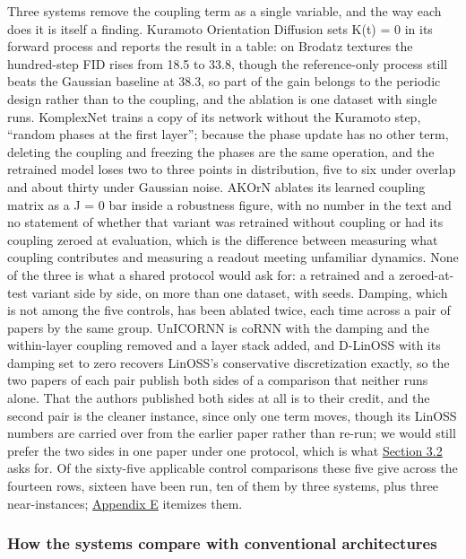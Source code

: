 \documentclass[10pt]{article}
\begin{document}
Three systems remove the coupling term as a single variable, and the way
each does it is itself a finding. Kuramoto Orientation Diffusion sets
K(t) = 0 in its forward process and reports the result in a table: on
Brodatz textures the hundred-step FID rises from 18.5 to 33.8, though
the reference-only process still beats the Gaussian baseline at 38.3, so
part of the gain belongs to the periodic design rather than to the
coupling, and the ablation is one dataset with single runs. KomplexNet
trains a copy of its network without the Kuramoto step, ``random phases
at the first layer''; because the phase update has no other term,
deleting the coupling and freezing the phases are the same operation,
and the retrained model loses two to three points in distribution, five
to six under overlap and about thirty under Gaussian noise. AKOrN
ablates its learned coupling matrix as a J = 0 bar inside a robustness
figure, with no number in the text and no statement of whether that
variant was retrained without coupling or had its coupling zeroed at
evaluation, which is the difference between measuring what coupling
contributes and measuring a readout meeting unfamiliar dynamics. None of
the three is what a shared protocol would ask for: a retrained and a
zeroed-at-test variant side by side, on more than one dataset, with
seeds. Damping, which is not among the five controls, has been ablated
twice, each time across a pair of papers by the same group. UnICORNN is
coRNN with the damping and the within-layer coupling removed and a layer
stack added, and D-LinOSS with its damping set to zero recovers LinOSS's
conservative discretization exactly, so the two papers of each pair
publish both sides of a comparison that neither runs alone. That the
authors published both sides at all is to their credit, and the second
pair is the cleaner instance, since only one term moves, though its
LinOSS numbers are carried over from the earlier paper rather than
re-run; we would still prefer the two sides in one paper under one
protocol, which is what \hyperref[sec-3-2]{Section 3.2} asks for. Of the
sixty-five applicable control comparisons these five give across the
fourteen rows, sixteen have been run, ten of them by three systems, plus
three near-instances; \hyperref[sec-E]{Appendix E} itemizes them.

\subsubsection{How the systems compare with conventional
architectures}\label{sec-2-3-4}
\end{document}
